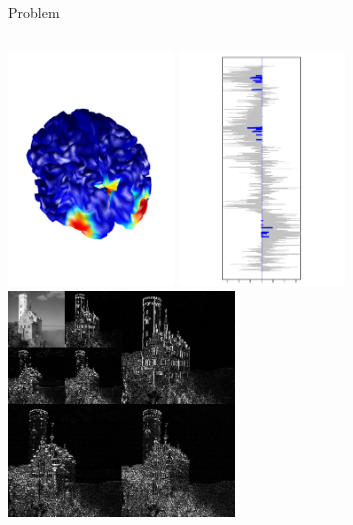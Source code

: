 \documentclass[9pt]{beamer}
\begin{document}
\begin{frame}{Problem}
\begin{columns}
    \begin{column}{0.5\textwidth}
      \centering
      \includegraphics[width=0.33\textwidth]{andersen-eeg}
      \hfil
      \includegraphics[width=0.33\textwidth]{sls-genome}
      \hfil
      \includegraphics[width=0.45\textwidth]{wavelet_transform}
    \end{column}
  \end{columns}
\end{frame}
\end{document}
